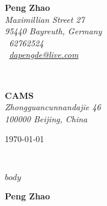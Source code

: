 \documentclass[11pt]{article}
\begin{document}
\sffamily   %
\hfill%
\begin{minipage}[t]{.6\textwidth}
\raggedleft%
{\bfseries Peng Zhao}\\[.35ex]
\small\itshape%
Maximillian Street 27\\
95440 Bayreuth, Germany\\[.35ex]
\Telefon~62762524\\
\Letter~\href{mailto:dapengde@live.com}{dapengde@live.com}
\end{minipage}\\[1em]
%
\begin{minipage}[t]{.4\textwidth}
\raggedright%
{\bfseries CAMS}\\[.35ex]
\small\itshape%
Zhongguancunnandajie 46\\
100000 Beijing, China\\[.35ex]
\end{minipage}
\hfill %
\begin{minipage}[t]{.4\textwidth}
\raggedleft %
\today
\end{minipage}\\[2em]
\raggedright
\calligra\huge
$body$

{\bfseries Peng Zhao}\\
%
\end{document}

